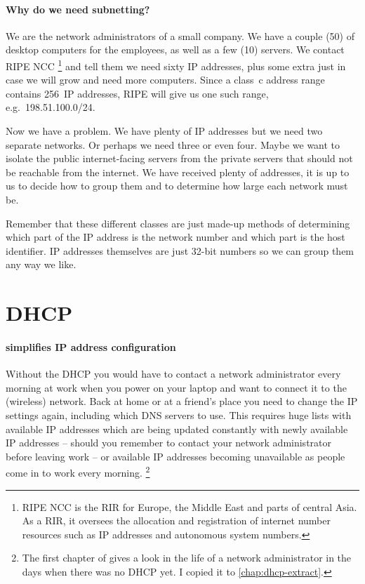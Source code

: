 \paragraph{Why do we need subnetting?}
We are the network administrators of a small company.
We have a couple (50) of desktop computers for the employees, as well as a few (10) servers.
We contact \acs{RIPE} \acs{NCC}%
    \footnote{\gls{RIPE} \gls{NCC} is the \gls{RIR} for Europe, the Middle East and parts of central Asia. As a \gls{RIR}, it oversees the allocation and registration of internet number resources such as \acs{IP} addresses and autonomous system numbers.}
and tell them we need sixty \acs{IP} addresses, plus some extra just in case we will grow and need more computers.
Since a class~c address range contains 256~\acs{IP} addresses, \gls{RIPE} will give us one such range, e.g.~198.51.100.0/24.%

Now we have a problem.
We have plenty of \acs{IP} addresses but we need two separate networks.
Or perhaps we need three or even four.
Maybe we want to isolate the public internet-facing servers from the private servers that should not be reachable from the internet.
We have received plenty of addresses, it is up to us to decide how to group them and to determine how large each network must be.

Remember that these different classes are just made-up methods of determining which part of the \acs{IP} address is the network number and which part is the host identifier.
\acs{IP} addresses themselves are just 32-bit numbers so we can group them any way we like.


\section{\acl{DHCP}}
\label{sec:ip-dhcp}


\paragraph{simplifies \acs{IP} address configuration}
Without the \gls{DHCP} you would have to contact a network administrator every morning at work when you power on your laptop and want to connect it to the (wireless) network.
Back at home or at a friend's place you need to change the \acs{IP} settings again, including which \acs{DNS} servers to use.
This requires huge lists with available \acs{IP} addresses which are being updated constantly with newly available \acs{IP} addresses -- should you remember to contact your network administrator before leaving work -- or available \acs{IP} addresses becoming unavailable as people come in to work every morning.%
   \footnote{%
      The first chapter of \textcite[3-7]{droms} gives a look in the life of a network administrator in the days when there was no \acs{DHCP} yet.
      I copied it to \vref{chap:dhcp-extract}.
   }

